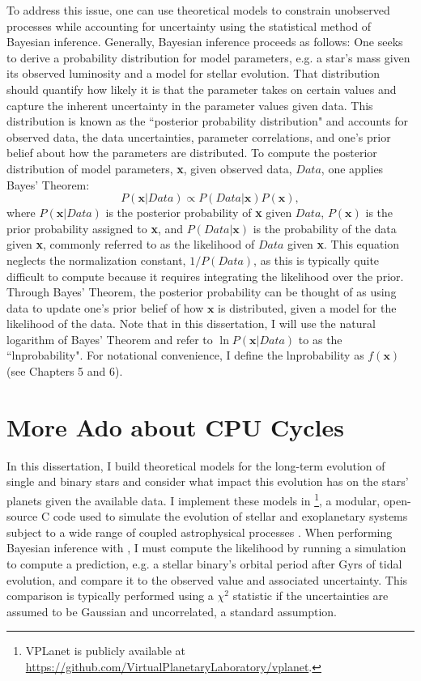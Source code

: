 To address this issue, one can use theoretical models to constrain unobserved processes while accounting for uncertainty using the statistical method of Bayesian inference. Generally, Bayesian inference proceeds as follows:  One seeks to derive a probability distribution for model parameters, e.g. a star's mass given its observed luminosity and a model for stellar evolution.  That distribution should quantify how likely it is that the parameter takes on certain values and capture the inherent uncertainty in the parameter values given data.  This distribution is known as the ``posterior probability distribution" and accounts for observed data, the data uncertainties, parameter correlations, and one's prior belief about how the parameters are distributed. To compute the posterior distribution of model parameters, \textbf{x}, given observed data, $Data$, one applies Bayes' Theorem: 
\begin{equation} \label{intro:eqn:bayes}
P(\textbf{x} | Data) \propto P(Data | \textbf{x}) P(\textbf{x}),
\end{equation}
where $P(\textbf{x} | Data)$ is the posterior probability of \textbf{x} given $Data$, $P(\textbf{x})$ is the prior probability assigned to \textbf{x}, and $P(Data | \textbf{x})$ is the probability of the data given \textbf{x}, commonly referred to as the likelihood of $Data$ given \textbf{x}. This equation neglects the normalization constant, $1/P(Data)$, as this is typically quite difficult to compute because it requires integrating the likelihood over the prior. Through Bayes' Theorem, the posterior probability can be thought of as using data to update one's prior belief of how $\textbf{x}$ is distributed, given a model for the likelihood of the data. Note that in this dissertation, I will use the natural logarithm of Bayes' Theorem and refer to $\ln P(\textbf{x} | Data)$ to as the ``lnprobability". For notational convenience, I define the lnprobability as $f(\textbf{x})$ (see Chapters 5 and 6). 

\section{More Ado about CPU Cycles}

In this dissertation, I build theoretical models for the long-term evolution of single and binary stars and consider what impact this evolution has on the stars' planets given the available data. I implement these models in \vplanet\footnote{VPLanet is publicly available
at \href{https://github.com/VirtualPlanetaryLaboratory/vplanet}{{https://github.com/VirtualPlanetaryLaboratory/vplanet}}.}, a modular, open-source C code used to simulate the evolution of stellar and exoplanetary systems subject to a wide range of coupled astrophysical processes \citep{Barnes2019}. When performing Bayesian inference with \vplanet, I must compute the likelihood by running a simulation to compute a prediction, e.g. a stellar binary's orbital period after Gyrs of tidal evolution, and compare it to the observed value and associated uncertainty. This comparison is typically performed using a $\chi^2$ statistic if the uncertainties are assumed to be Gaussian and uncorrelated, a standard assumption. 

